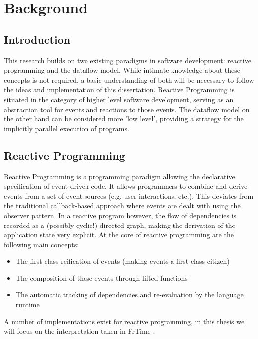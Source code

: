 \chapter{Background}

\section{Introduction}

This research builds on two existing paradigms in software development: reactive programming and the dataflow model. While intimate knowledge about these concepts is not required, a basic understanding of both will be necessary to follow the ideas and implementation of this dissertation. Reactive Programming is situated in the category of higher level software development, serving as an abstraction tool for events and reactions to those events. The dataflow model on the other hand can be considered more 'low level', providing a strategy for the implicitly parallel execution of programs. 

\newpage

\section{Reactive Programming}

Reactive Programming is a programming paradigm allowing the declarative specification of event-driven code. It allows programmers to combine and derive events from a set of event sources (e.g. user interactions, etc.). This deviates from the traditional callback-based approach where events are dealt with using the observer pattern. In a reactive program however, the flow of dependencies is recorded as a (possibly cyclic!) directed graph, making the derivation of the application state very explicit.
At the core of reactive programming are the following main concepts:
\begin{itemize}
	\item The first-class reification of events (making events a first-class citizen)
	\item The composition of these events through lifted functions
	\item The automatic tracking of dependencies and re-evaluation by the language runtime
\end{itemize}

A number of implementations exist for reactive programming, in this thesis we will focus on the interpretation taken in FrTime \cite{cooper_embedding_2006}.

